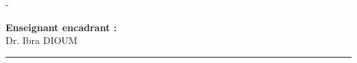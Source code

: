 \begin{titlingpage}
\begin{SingleSpace}
\begin{adjustwidth*}{\unitlength}{-\unitlength}
\begin{center}
				\begin{minipage}[t]{0.33333\textwidth}
					\centering
					{\textbf{Enseignant encadrant :} }\\
					{{Dr. Ibra DIOUM}}\\
				\end{minipage}
				\vspace{6mm}
				\hrule~\\[0.1cm]
				\vspace{12mm}
				~\\[0.1cm]
			\end{center}
		\end{adjustwidth*}
	\end{SingleSpace}
\end{titlingpage}
\clearpage
